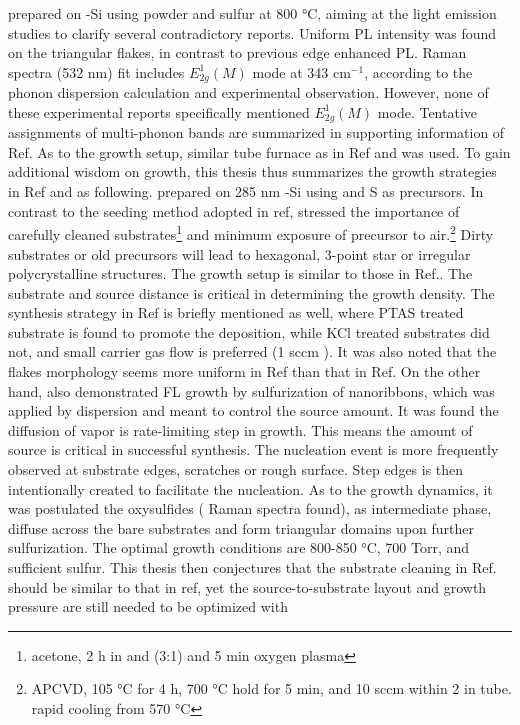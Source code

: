 \citeauthor{Peimyoo2013} prepared  on -Si using  powder and sulfur at 800 \si{\degreeCelsius}, aiming at the light emission studies to clarify several contradictory reports.\cite{Peimyoo2013} Uniform PL intensity was found on the triangular  flakes, in contrast to previous edge enhanced PL.\cite{Berkdemir2013} Raman spectra (532 nm) fit includes $E_{2g}^1(M)$ mode at 343 cm$^{-1}$, according to the phonon dispersion calculation \cite{Molina-Sanchez2011} and experimental observation\cite{Zeng2013a,Zhao2013,Lee2013}. However, none of these experimental reports specifically mentioned $E_{2g}^1(M)$ mode. Tentative assignments of multi-phonon bands are summarized in supporting information of Ref\cite{Zhao2013}. As to the growth setup, similar tube furnace as in Ref \cite{VanderZande2013} and \cite{Najmaei2013} was used. To gain additional wisdom on  growth, this thesis thus summarizes the growth strategies in Ref \cite{VanderZande2013} and \cite{Najmaei2013} as following. \citeauthor{VanderZande2013} prepared  on 285 nm -Si using  and S as precursors.\cite{VanderZande2013} In contrast to the seeding method adopted in ref\cite{Lee2013,Lee2012b}, \citeauthor{VanderZande2013} stressed the importance of carefully cleaned substrates\footnote{acetone, 2 h in  and  (3:1) and 5 min oxygen plasma} and minimum exposure of precursor to air.\footnote{APCVD, 105 \si{\degreeCelsius} for 4 h, 700 \si{\degreeCelsius} hold for 5 min, and 10 sccm  within 2 in tube. rapid cooling from 570 \si{\degreeCelsius}} Dirty substrates or old precursors will lead to hexagonal, 3-point star or irregular polycrystalline structures. The growth setup is similar to those in Ref.\cite{Lee2012b}. The substrate and  source distance is critical in determining the growth density. The synthesis strategy in Ref\cite{Lee2013,Lee2012b} is briefly mentioned as well, where PTAS treated substrate is found to promote the deposition, while KCl treated substrates did not, and small carrier gas flow is preferred (1 sccm ). It was also noted that the  flakes morphology seems more uniform in Ref\cite{VanderZande2013} than that in Ref\cite{Lee2012b}. On the other hand, \citeauthor{Najmaei2013} also demonstrated  FL growth by sulfurization of  nanoribbons,\cite{Najmaei2013} which was applied by dispersion and meant to control the source amount. It was found the diffusion of vapor  is rate-limiting step in  growth. This means the amount of source is critical in successful synthesis. The nucleation event is more frequently observed at substrate edges, scratches or rough surface. Step edges is then intentionally created to facilitate the nucleation. As to the growth dynamics, it was postulated the oxysulfides ( Raman spectra found), as intermediate phase, diffuse across the bare substrates and form triangular domains upon further sulfurization. The optimal growth conditions are 800-850 \si{\degreeCelsius}, 700 Torr, and sufficient sulfur. This thesis then conjectures that the substrate cleaning in Ref.\cite{Peimyoo2013} should be similar to that in ref\cite{VanderZande2013}, yet the source-to-substrate layout and growth pressure are still needed to be optimized with 